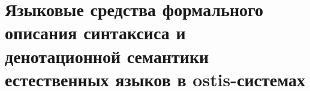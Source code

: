 \chapter{Языковые средства формального описания синтаксиса и денотационной семантики естественных языков в ostis-системах}
\label{chapter_lang}


\vspace{-7\baselineskip}

